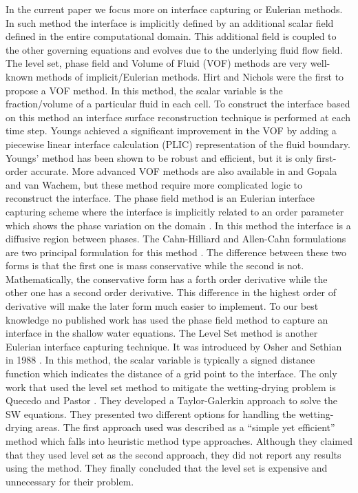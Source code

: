 \documentclass[letterpaper,10pt]{article}
\begin{document}
In the current paper we focus more on interface capturing or Eulerian methods. In such method the interface is implicitly defined by an additional scalar field defined in the entire 
computational domain. This additional field is coupled to the other governing equations and evolves due to the underlying fluid flow field.
The level set, phase field and Volume of Fluid (VOF) methods are very well-known methods of implicit/Eulerian methods.
Hirt and Nichols \cite{hirt1981vfv} were the first to propose a VOF method. 
In this method, the scalar variable is the fraction/volume of a particular fluid in each cell.
To construct the interface based on this method an interface surface reconstruction technique is performed at each time step. 
Youngs \cite{youngs1982tdm} achieved a significant improvement 
in the VOF by adding a piecewise linear interface calculation (PLIC) representation of the fluid boundary. 
Youngs' method has been shown to be robust and efficient, but it is only first-order accurate. 
More advanced VOF methods are also available in \cite{gerlach2006cvf} and Gopala and van Wachem\cite{gopala2008vfm}, but these method require more complicated logic to 
reconstruct the interface.
The phase field method is an Eulerian interface capturing scheme where the interface is implicitly related to an order parameter which shows the phase variation on the domain \cite{Anderson1998}. 
In this method the interface is a diffusive region between phases. 
The Cahn-Hilliard and Allen-Cahn formulations are two principal formulation for this method \cite{CahnHilliard1958i,CahnHilliard1958ii,Yang2006}. The difference between these two forms is 
that the first one is mass conservative while the second is not. Mathematically, the conservative form has a forth order derivative while the other one has a second order derivative. 
This difference in the highest order of derivative will make the later form much easier to implement.
To our best knowledge no published work has used the phase field method to capture an interface in the shallow water equations.
The Level Set method is another Eulerian interface capturing technique. It was introduced by Osher and Sethian in 1988 \cite{Osher1988}. In this method, the scalar variable is typically 
a signed distance function which indicates the distance of a grid point to the interface. 
The only work that used the level set method to mitigate the wetting-drying problem is Quecedo and Pastor \cite{quecedo2002rtg}. 
They developed a Taylor-Galerkin approach to solve the SW equations. They presented two 
different options for handling the wetting-drying areas. The first approach used was described as a ``simple yet efficient'' method which falls into heuristic method type approaches. 
Although they claimed that they used level set as the second approach, they did not report any results using the method.
They finally concluded that the level set is expensive and unnecessary for their problem.
\end{document}

